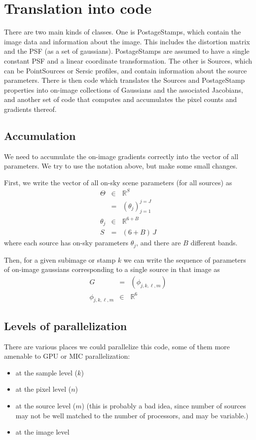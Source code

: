 \documentclass[modern]{aastex62}
\begin{document}
\section{Translation into code}
There are two main kinds of classes.
One is PostageStamps, which contain the image data and information about the image.
This includes the distortion matrix and the PSF (as a set of gaussians).
PostageStamps are assumed to have a single constant PSF and a linear coordinate transformation.
 The other is Sources, which can be PointSources or Sersic profiles, and contain information about the source parameters.
There is then code which translates the Sources and PostageStamp properties into on-image collections of Gaussians and the associated Jacobians, 
and another set of code that computes and accumulates the pixel counts and gradients thereof.



\subsection{Accumulation}
We need to accumulate the on-image gradients correctly into the vector of all parameters. 
We try to use the notation above, but make some small changes.

First, we write the vector of all on-sky scene parameters (for all sources) as 
\begin{eqnarray}
\Theta & \in & \mathbb{R}^{S} \\
 & = & (\theta_j)_{j=1}^{j=J} \\
\theta_j & \in & \mathbb{R}^{6+B} \\
S & = & (6 + B) \, J
\end{eqnarray}
where each source has on-sky parameters $\theta_j$, and there are $B$ different bands.

Then, for a given subimage or stamp $k$ we can write the sequence of parameters of on-image gaussians corresponding to a single source in that image as 
\begin{eqnarray}
G & = & (\phi_{j, k, \ell, m}) \\
\phi_{j, k, \ell, m} & \in & \mathbb{R}^{6}
\end{eqnarray}


\subsection{Levels of parallelization}
There are various places we could parallelize this code, 
some of them more amenable to GPU or MIC parallelization:
\begin{itemize}

\item at the sample level ($k$)

\item at the pixel level ($n$)

\item at the source level ($m$) (this is probably a bad idea, since number of sources may not be well matched to the number of processors, and may be variable.)

\item at the image level
\end{itemize}
\end{document}
